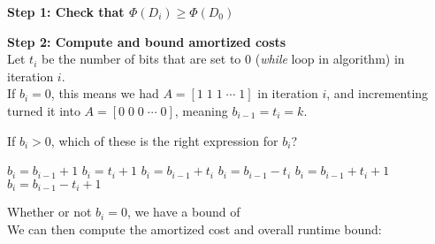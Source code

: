 \documentclass[11  pt]{article}
\begin{document}
\textbf{Step 1: Check that $\Phi(D_i) \geq \Phi(D_0)$}

\vspace{3cm}

\textbf{Step 2: Compute and bound amortized costs}\\

Let $t_i$ be the number of bits that are set to $0$ (\emph{while} loop in algorithm) in iteration $i$.\\

If $b_i = 0$, this means we had $A = [1 \; 1 \; 1 \; \cdots \; 1]$ in iteration $i$, and incrementing turned it into $A = [0 \; 0 \; 0 \; \cdots \; 0]$, meaning $b_{i-1} = t_i = k$. \\

\begin{Qu}
If $b_i > 0$, which of these is the right expression for $b_i$?
\begin{itemize}
\aitem $b_i = b_{i-1} + 1$
\bitem $b_i = t_i + 1$
\citem $b_i = b_{i-1} + t_i$ 
\ditem $b_i = b_{i-1} - t_i$ 
\eitem $b_i = b_{i-1} + t_i + 1$
\fitem $b_i = b_{i-1} - t_i + 1$
\end{itemize}
\end{Qu}

\pagebreak
Whether or not $b_i = 0$, we have a bound of \\

We can then compute the amortized cost and overall runtime bound:
\end{document}
